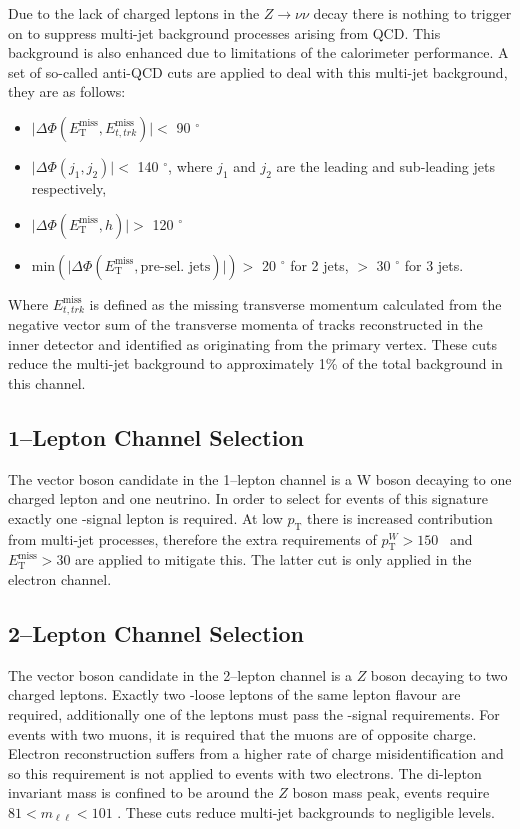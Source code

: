 Due to the lack of charged leptons in the $Z \rightarrow \nu\nu$ decay there is
nothing to trigger on to suppress multi-jet background processes arising from
QCD. This background is also enhanced due to limitations of the calorimeter
performance. A set of so-called anti-QCD cuts are applied to deal with this
multi-jet background, they are as follows:
\begin{itemize}
\item $\lvert \Delta \Phi ( E_{\mathrm{T}}^{\text{miss}} ,
  E_{t, trk}^{\text{miss}} ) \rvert <$ 90 $^\circ$
\item $\lvert \Delta \Phi ( j_1 , j_2 ) \rvert <$ 140 $^\circ$, where $j_1$ and
  $j_2$ are the leading and sub-leading jets respectively,
\item $\lvert \Delta \Phi ( E_{\mathrm{T}}^{\text{miss}} , h ) \rvert >$ 120 $^\circ$
\item $\text{min} ( \lvert \Delta \Phi ( E_{\mathrm{T}}^{\text{miss}} ,
  \text{pre-sel. jets}) \rvert ) >$ 20 $^\circ$ for  2 jets,
  $>$ 30 $^\circ$ for 3 jets.
\end{itemize}
Where $E_{t, trk}^{\text{miss}}$ is defined as the missing transverse momentum
calculated from the negative vector sum of the transverse momenta of tracks
reconstructed in the inner detector and identified as originating from the
primary vertex. These cuts reduce the multi-jet background to approximately 1\%
of the total background in this channel.

\subsection{1--Lepton Channel Selection}
\label{sec:1lep-selection}

The vector boson candidate in the 1--lepton channel is a W boson decaying to one
charged lepton and one neutrino. In order to select for events of this signature
exactly one \WH-signal lepton is required. At low $p_{\mathrm{T}}$ there is increased
contribution from multi-jet processes, therefore the extra requirements of
$p_{\mathrm{T}}^{W} > 150$ \GeV\ and $E_{\mathrm{T}}^{\text{miss}} > 30$ \GeV are applied to mitigate
this. The latter cut is only applied in the electron channel.  

\subsection{2--Lepton Channel Selection}
\label{sec:2lep-selection}

The vector boson candidate in the 2--lepton channel is a $Z$ boson decaying to
two charged leptons. Exactly two \VH-loose leptons of the same lepton flavour
are required, additionally one of the leptons must pass the \ZH-signal
requirements. For events with two muons, it is required that the muons are of
opposite charge. Electron reconstruction suffers from a higher rate of charge
misidentification and so this requirement is not applied to events with two
electrons. The di-lepton invariant mass is confined to be around the $Z$ boson
mass peak, events require $81 < m_{\ell\ell} < 101$ \GeV. These cuts reduce
multi-jet backgrounds to negligible levels.

